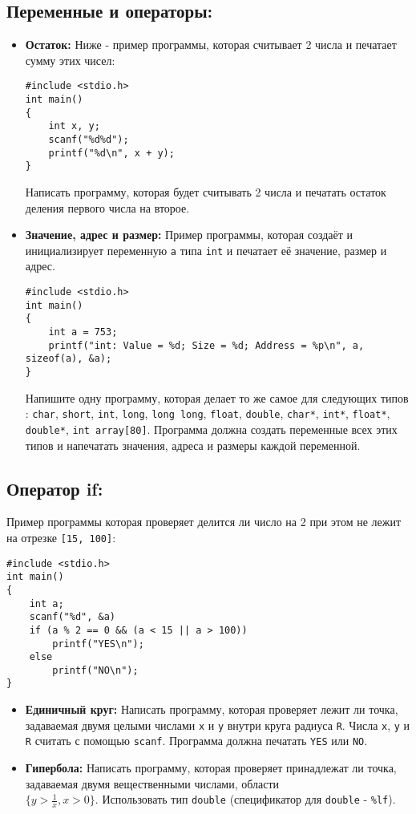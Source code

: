 \documentclass{article}
\begin{document}
\subsection*{Переменные и операторы:}
\begin{itemize}
\item \textbf{Остаток:} Ниже - пример программы, которая считывает 2 числа и печатает сумму этих чисел:
\begin{lstlisting}
#include <stdio.h>
int main()
{
	int x, y;
	scanf("%d%d");
	printf("%d\n", x + y);
}
\end{lstlisting}
Написать программу, которая будет считывать 2 числа и печатать остаток деления первого числа на второе.
\item \textbf{Значение, адрес и размер:} Пример программы, которая создаёт и инициализирует переменную \texttt{a} типа \texttt{int} и печатает её значение, размер и адрес.
\begin{lstlisting}
#include <stdio.h>
int main()
{
	int a = 753;
	printf("int: Value = %d; Size = %d; Address = %p\n", a, sizeof(a), &a);
}
\end{lstlisting}
Напишите одну программу, которая делает то же самое для следующих типов : \texttt{char}, \texttt{short}, \texttt{int}, \texttt{long}, \texttt{long long}, \texttt{float}, \texttt{double}, \texttt{char*}, \texttt{int*}, \texttt{float*}, \texttt{double*}, \texttt{int array[80]}. Программа должна создать переменные всех этих типов и напечатать значения, адреса и размеры каждой переменной.
\end{itemize}
\newpage

\subsection*{Оператор if:}
Пример программы которая проверяет делится ли число на 2 при этом не лежит на отрезке \texttt{[15, 100]}:
\begin{lstlisting}
#include <stdio.h>
int main()
{
	int a;
	scanf("%d", &a)
	if (a % 2 == 0 && (a < 15 || a > 100))
		printf("YES\n");
	else
		printf("NO\n");
}
\end{lstlisting}
\begin{itemize}
\item \textbf{Единичный круг:} Написать программу, которая проверяет лежит ли точка, задаваемая двумя целыми числами \texttt{x} и \texttt{y} внутри круга радиуса \texttt{R}. Числа \texttt{x}, \texttt{y} и \texttt{R} считать с помощью \texttt{scanf}. Программа должна печатать \texttt{YES} или \texttt{NO}.
\item \textbf{Гипербола:} Написать программу, которая проверяет принадлежат ли точка, задаваемая двумя вещественными числами, области\\  $\{y > \frac{1}{x}, x > 0\}$. Использовать тип \texttt{double} (спецификатор для \texttt{double} - \texttt{\%lf}).
\end{itemize}
\end{document}
